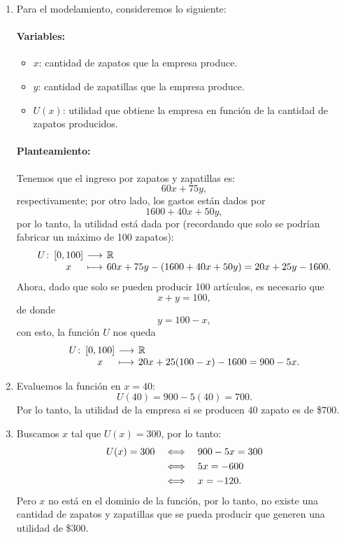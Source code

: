 \documentclass[10pt,respuestas,a4]{aleph-examen}
\begin{document}
\begin{preguntas}
\begin{respuesta}\hspace{0pt}
    \begin{enumerate}[label=\textit{\alph*)},listparindent= \parindent, leftmargin=*]
    \item 
        Para el modelamiento, consideremos lo siguiente:
        \paragraph{Variables:}
        \begin{itemize}
        \item
            $x$: cantidad de zapatos que la empresa produce.
        \item
            $y$: cantidad de zapatillas que la empresa produce.
        \item
            $U(x)$: utilidad que obtiene la empresa en función de la cantidad de zapatos producidos.
        \end{itemize}
        \paragraph{Planteamiento:} Tenemos que el ingreso por zapatos y zapatillas es:
        \[
            60x + 75y,
        \]
        respectivamente; por otro lado, los gastos están dados por
        \[
            1600 + 40x + 50y,
        \]
        por lo tanto, la utilidad está dada por (recordando que solo se podrían fabricar un máximo de 100 zapatos):
        \[
            \funcion{U}{\l[0,100\r]}{\R}{x}{60x + 75y -(1600 + 40x + 50y)= 20 x + 25 y - 1600 .}
        \]
        Ahora, dado que solo se pueden producir 100 artículos, es necesario que
        \[
            x+y=100,
        \]
        de donde
        \[
            y = 100 - x,
        \]
        con esto, la función $U$ nos queda
        \[
            \funcion{U}{[0,100]}{\R}
            {x}{20 x + 25 (100 - x) - 1600 = 900 - 5x.}
        \]
    \item
        Evaluemos la función en $x = 40$:
        \[
            U(40) = 900 - 5(40)
            = 700.
        \]
        Por lo tanto, la utilidad de la empresa si se producen $40$ zapato es de \$$700$.
    \item
        Buscamos $x$ tal que $U(x) = 300$, por lo tanto:
        \begin{align*}
        U(x) = 300 
           &\quad\Longleftrightarrow\quad 900 - 5x = 300 \\
           &\quad\Longleftrightarrow\quad 5x = -600 \\
           &\quad\Longleftrightarrow\quad x = -120.
        \end{align*}
        Pero $x$ no está en el dominio de la función, por lo tanto, no existe una cantidad de zapatos y zapatillas que se pueda producir que generen una utilidad de \$$300$.\qedhere
    \end{enumerate}
\end{respuesta}
    

\end{preguntas}
\final
\end{document}
